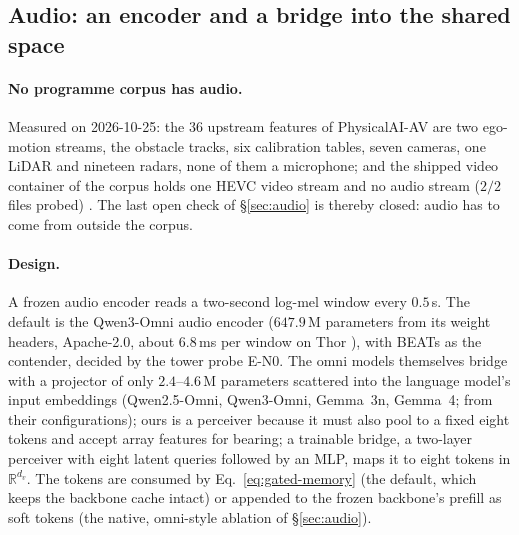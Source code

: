 \subsection{Audio: an encoder and a bridge into the shared space}\label{sec:audio-bridge}
\paragraph{No programme corpus has audio.} Measured on 2026-10-25: the $36$ upstream features of PhysicalAI-AV are two ego-motion streams, the obstacle tracks, six calibration tables, seven cameras, one LiDAR and nineteen radars, none of them a microphone; and the shipped video container of the corpus holds one HEVC video stream and no audio stream ($2/2$ files probed) \evM. The last open check of \S\ref{sec:audio} is thereby closed: audio has to come from outside the corpus.
\paragraph{Design.} A frozen audio encoder reads a two-second log-mel window every $0.5$\,s. The default is the Qwen3-Omni audio encoder ($647.9$\,M parameters \evM{} from its weight headers, Apache-2.0, about $6.8$\,ms per window on Thor \evE), with BEATs as the contender, decided by the tower probe E-N0. The omni models themselves bridge with a projector of only $2.4$--$4.6$\,M parameters scattered into the language model's input embeddings (Qwen2.5-Omni, Qwen3-Omni, Gemma~3n, Gemma~4; \evM{} from their configurations); ours is a perceiver because it must also pool to a fixed eight tokens and accept array features for bearing; a trainable bridge, a two-layer perceiver with eight latent queries followed by an MLP, maps it to eight tokens in $\mathbb R^{d_v}$. The tokens are consumed by Eq.~\eqref{eq:gated-memory} (the default, which keeps the backbone cache intact) or appended to the frozen backbone's prefill as soft tokens (the native, omni-style ablation of \S\ref{sec:audio}).
